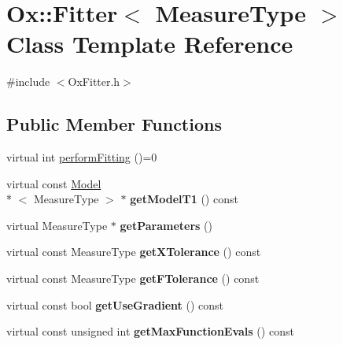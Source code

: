 \hypertarget{class_ox_1_1_fitter}{\section{Ox\-:\-:Fitter$<$ Measure\-Type $>$ Class Template Reference}
\label{class_ox_1_1_fitter}
}


{\ttfamily \#include $<$Ox\-Fitter.\-h$>$}

\subsection*{Public Member Functions}
\begin{DoxyCompactItemize}
\item 
virtual int \hyperlink{class_ox_1_1_fitter_a8f240f0da86d06b339ab2747e87f21b9}{perform\-Fitting} ()=0
\item 
\hypertarget{class_ox_1_1_fitter_af46056b43fa82c00e21cf89fb11b4d7e}{virtual const \hyperlink{class_ox_1_1_model}{Model}\\*
$<$ Measure\-Type $>$ $\ast$ {\bfseries get\-Model\-T1} () const }\label{class_ox_1_1_fitter_af46056b43fa82c00e21cf89fb11b4d7e}

\item 
\hypertarget{class_ox_1_1_fitter_a5e87dd37738745f98d904865f6b89219}{virtual Measure\-Type $\ast$ {\bfseries get\-Parameters} ()}\label{class_ox_1_1_fitter_a5e87dd37738745f98d904865f6b89219}

\item 
\hypertarget{class_ox_1_1_fitter_a21f92547f664c9b6f3fa8da4c7d16965}{virtual const Measure\-Type {\bfseries get\-X\-Tolerance} () const }\label{class_ox_1_1_fitter_a21f92547f664c9b6f3fa8da4c7d16965}

\item 
\hypertarget{class_ox_1_1_fitter_ac62bf275718aafc95b5e49d0aa9fc1ef}{virtual const Measure\-Type {\bfseries get\-F\-Tolerance} () const }\label{class_ox_1_1_fitter_ac62bf275718aafc95b5e49d0aa9fc1ef}

\item 
\hypertarget{class_ox_1_1_fitter_aba3fc8ad5260390faf59e2f904ab6d6d}{virtual const bool {\bfseries get\-Use\-Gradient} () const }\label{class_ox_1_1_fitter_aba3fc8ad5260390faf59e2f904ab6d6d}

\item 
\hypertarget{class_ox_1_1_fitter_a04f36e075f86c6a89df833d17b9f029d}{virtual const unsigned int {\bfseries get\-Max\-Function\-Evals} () const }\label{class_ox_1_1_fitter_a04f36e075f86c6a89df833d17b9f029d}


\end{DoxyCompactItemize}
